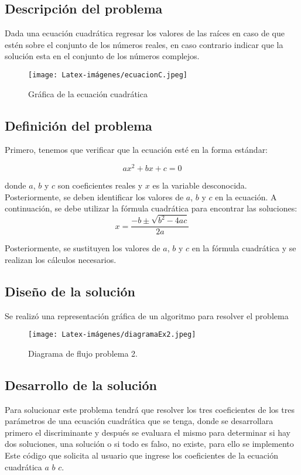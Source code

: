 
\subsection{Descripción del problema}
 Dada una ecuación cuadrática regresar los valores de las raíces en caso de que estén sobre el conjunto de los números reales, en caso contrario indicar que la solución esta en el conjunto de los números complejos.

\begin {figure}[ht]
\centerline{\texttt{[image: Latex-imágenes/ecuacionC.jpeg]}}
\caption{Gráfica de la ecuación cuadrática}
\label{fig}
\end {figure}

\subsection{Definición del problema}
Primero, tenemos que verificar que la ecuación esté en la forma estándar:

\begin{equation}
    ax^2 + bx + c = 0
\end{equation}


donde $a$, $b$ y $c$ son coeficientes reales y $x$ es la variable desconocida. Posteriormente, se deben identificar los valores de $a$, $b$ y $c$ en la ecuación. A continuación, se debe utilizar la fórmula cuadrática para encontrar las soluciones: 
\begin{equation}
x = \frac{-b \pm \sqrt{b^2 - 4ac}}{2a}
\end{equation}


Posteriormente, se sustituyen los valores de $a$, $b$ y $c$ en la fórmula cuadrática y se realizan los cálculos necesarios.\\

\subsection{Diseño de la solución}

Se realizó una representación gráfica de un algoritmo para resolver el problema
\begin {figure}[h!]
\centerline{\texttt{[image: Latex-imágenes/diagramaEx2.jpeg]}}
\caption{Diagrama de flujo problema 2.}
\label{fig}
\end {figure}

\subsection{Desarrollo de la solución}
Para solucionar este problema tendrá que resolver los tres coeficientes de los tres parámetros de una ecuación cuadrática que se tenga, donde se desarrollara primero el discriminante y después se evaluara el mismo para determinar si hay dos soluciones, una solución o si todo es falso, no existe, para ello se implemento Este código que solicita al usuario que ingrese los coeficientes de la ecuación cuadrática $a$ $b$ $c$. 
 
